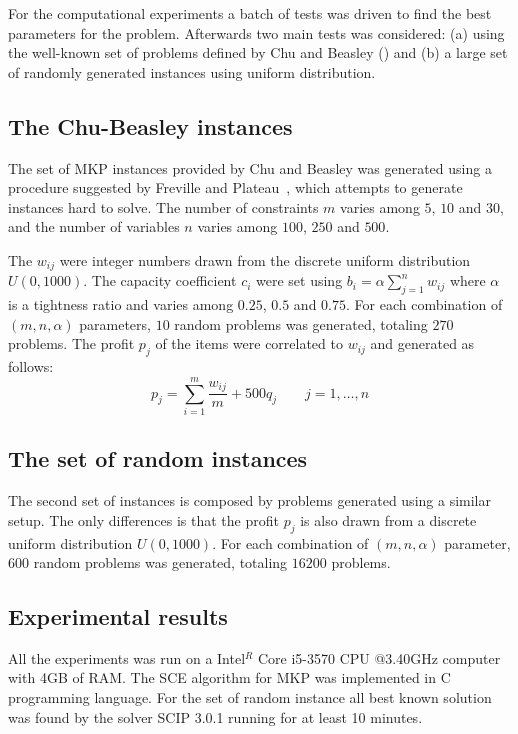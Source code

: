For the computational experiments a batch of tests was driven to find the best
parameters for the problem.
Afterwards two main tests was considered:
(a) using the well-known set of problems defined by Chu and Beasley (\cite{Chu-Beasley-1998})
and (b) a large set of randomly generated instances using uniform distribution.

\subsection{The Chu-Beasley instances}

The set of MKP instances provided by Chu and Beasley was generated using a
procedure suggested by Freville and Plateau~\cite{freville1994efficient}, which
attempts to generate instances hard to solve.
The number of constraints $m$ varies among $5$, $10$ and $30$, and the number
of variables $n$ varies among $100$, $250$ and $500$.

The $w_{ij}$ were integer numbers drawn from the discrete uniform distribution
$U(0, 1000)$.
The capacity coefficient $c_i$ were set using
$b_i = \alpha\sum_{j=1}^{n} w_{ij}$ where $\alpha$ is a tightness ratio and
varies among $0.25$, $0.5$ and $0.75$.
For each combination of $(m,n,\alpha)$ parameters, $10$ random problems was generated,
totaling $270$ problems.
The profit $p_j$ of the items were correlated to $w_{ij}$ and generated as follows:
\begin{displaymath}
  p_j = \sum_{i=1}^m \frac{w_{ij}}{m} + 500q_j \qquad j = 1, \ldots, n
\end{displaymath}

\subsection{The set of random instances}

The second set of instances is composed by problems generated using a similar
setup.
The only differences is that the profit $p_j$ is also drawn from a discrete uniform
distribution $U(0, 1000)$.
For each combination of $(m, n, \alpha)$ parameter, $600$ random problems was
generated, totaling $16200$ problems.

\subsection{Experimental results}

All the experiments was run on a Intel$^R$ Core i5-3570 CPU @3.40GHz computer
with 4GB of RAM.
The SCE algorithm for MKP was implemented in C programming language.
For the set of random instance all best known solution was found by the solver
SCIP 3.0.1 running for at least 10 minutes.

